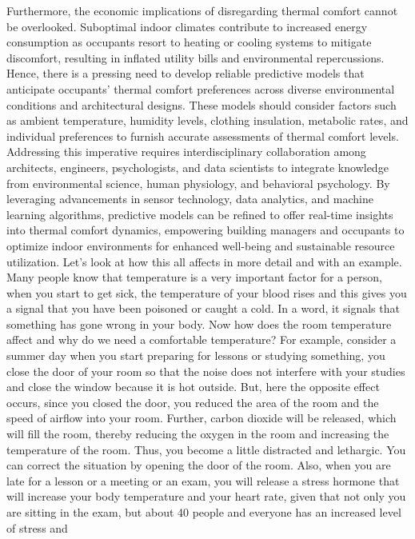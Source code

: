 \begin{multicols}{2}
Furthermore, the economic implications of disregarding thermal comfort
cannot be overlooked. Suboptimal indoor climates contribute to increased
energy consumption as occupants resort to heating or cooling systems to
mitigate discomfort, resulting in inflated utility bills and
environmental repercussions. Hence, there is a pressing need to develop
reliable predictive models that anticipate occupants' thermal comfort
preferences across diverse environmental conditions and architectural
designs. These models should consider factors such as ambient
temperature, humidity levels, clothing insulation, metabolic rates, and
individual preferences to furnish accurate assessments of thermal
comfort levels. Addressing this imperative requires interdisciplinary
collaboration among architects, engineers, psychologists, and data
scientists to integrate knowledge from environmental science, human
physiology, and behavioral psychology. By leveraging advancements in
sensor technology, data analytics, and machine learning algorithms,
predictive models can be refined to offer real-time insights into
thermal comfort dynamics, empowering building managers and occupants to
optimize indoor environments for enhanced well-being and sustainable
resource utilization. Let's look at how this all affects in more detail
and with an example. Many people know that temperature is a very
important factor for a person, when you start to get sick, the
temperature of your blood rises and this gives you a signal that you
have been poisoned or caught a cold. In a word, it signals that
something has gone wrong in your body. Now how does the room temperature
affect and why do we need a comfortable temperature? For example,
consider a summer day when you start preparing for lessons or studying
something, you close the door of your room so that the noise does not
interfere with your studies and close the window because it is hot
outside. But, here the opposite effect occurs, since you closed the
door, you reduced the area of the room and the speed of airflow into
your room. Further, carbon dioxide will be released, which will fill the
room, thereby reducing the oxygen in the room and increasing the
temperature of the room. Thus, you become a little distracted and
lethargic. You can correct the situation by opening the door of the
room. Also, when you are late for a lesson or a meeting or an exam, you
will release a stress hormone that will increase your body temperature
and your heart rate, given that not only you are sitting in the exam,
but about 40 people and everyone has an increased level of stress and

\end{multicols}

